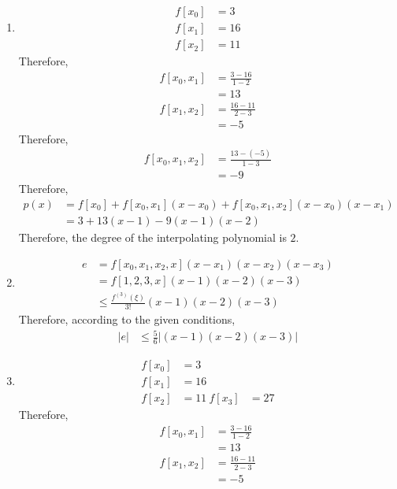 \documentclass[fleqn, a4paper, 12pt, twoside, titlepage]{article}
\theoremstyle{definition}
\theoremstyle{theorem}
\begin{document}
\begin{solution}
	\begin{enumerate}[leftmargin=*]
		\item
			\begin{align*}
				f[x_0] &= 3\\
				f[x_1] &= 16\\
				f[x_2] &= 11
			\end{align*}
			Therefore,
			\begin{align*}
				f[x_0,x_1] &= \frac{3 - 16}{1 - 2}\\
				&= 13\\
				f[x_1,x_2] &= \frac{16 - 11}{2 - 3}\\
				&= -5
			\end{align*}
			Therefore,
			\begin{align*}
				f[x_0,x_1,x_2] &= \frac{13 - (-5)}{1 - 3}\\
				&= -9
			\end{align*}
			Therefore,
			\begin{align*}
				p(x) &= f[x_0] + f[x_0,x_1] (x - x_0) + f[x_0,x_1,x_2] (x - x_0) (x - x_1)\\
				&= 3 + 13 (x - 1) - 9 (x - 1) (x - 2)
			\end{align*}
			Therefore, the degree of the interpolating polynomial is $2$.
		\item
			\begin{align*}
				e &= f[x_0,x_1,x_2,x] (x - x_1) (x - x_2) (x - x_3)\\
				&= f[1,2,3,x] (x - 1) (x - 2) (x - 3)\\
				&\le \frac{f^{(3)}(\xi)}{3!} (x - 1)(x - 2) (x - 3)
			\end{align*}
			Therefore, according to the given conditions,
			\begin{align*}
				|e| &\le \frac{5}{6} \left| (x - 1) (x - 2) (x - 3) \right|
			\end{align*}
		\item
			\begin{align*}
				f[x_0] &= 3\\
				f[x_1] &= 16\\
				f[x_2] &= 11\
				f[x_3] &= 27
			\end{align*}
			Therefore,
			\begin{align*}
				f[x_0,x_1] &= \frac{3 - 16}{1 - 2}\\
				&= 13\\
				f[x_1,x_2] &= \frac{16 - 11}{2 - 3}\\
				&= -5\\

\end{align*}
\end{enumerate}
\end{solution}
\end{document}
